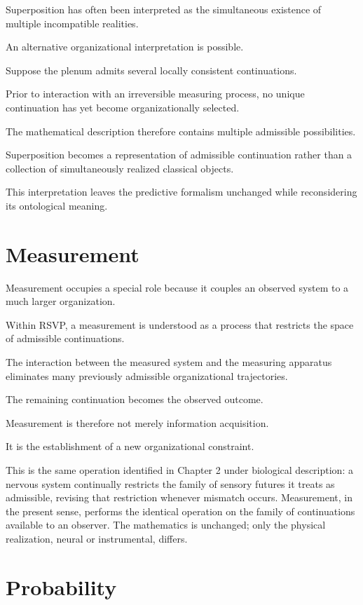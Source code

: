 \documentclass[11pt,oneside]{book}
\numberwithin{equation}{chapter}
\theoremstyle{definition}
\theoremstyle{plain}
\begin{document}
Superposition has often been interpreted as the simultaneous existence of
multiple incompatible realities.

An alternative organizational interpretation is possible.

Suppose the plenum admits several locally consistent continuations.

Prior to interaction with an irreversible measuring process, no unique
continuation has yet become organizationally selected.

The mathematical description therefore contains multiple admissible
possibilities.

Superposition becomes a representation of admissible continuation rather
than a collection of simultaneously realized classical objects.

This interpretation leaves the predictive formalism unchanged while
reconsidering its ontological meaning.

\section{Measurement}

Measurement occupies a special role because it couples an observed system to
a much larger organization.

Within RSVP, a measurement is understood as a process that restricts the
space of admissible continuations.

The interaction between the measured system and the measuring apparatus
eliminates many previously admissible organizational trajectories.

The remaining continuation becomes the observed outcome.

Measurement is therefore not merely information acquisition.

It is the establishment of a new organizational constraint.

This is the same operation identified in Chapter 2 under biological
description: a nervous system continually restricts the family of sensory
futures it treats as admissible, revising that restriction whenever mismatch
occurs. Measurement, in the present sense, performs the identical operation
on the family of continuations available to an observer. The mathematics is
unchanged; only the physical realization, neural or instrumental, differs.

\section{Probability}
\end{document}

